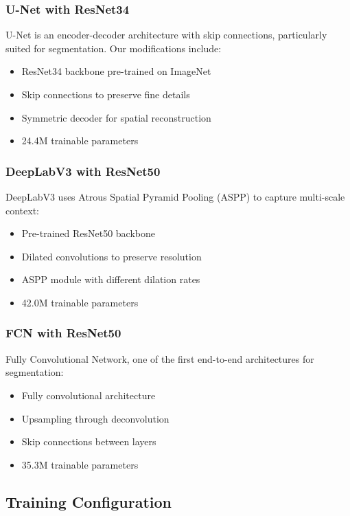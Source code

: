 \documentclass[12pt,a4paper]{article}
\begin{document}
\subsubsection{U-Net with ResNet34}

U-Net is an encoder-decoder architecture with skip connections, particularly suited for segmentation. Our modifications include:
\begin{itemize}
    \item ResNet34 backbone pre-trained on ImageNet
    \item Skip connections to preserve fine details
    \item Symmetric decoder for spatial reconstruction
    \item 24.4M trainable parameters
\end{itemize}

\subsubsection{DeepLabV3 with ResNet50}

DeepLabV3 uses Atrous Spatial Pyramid Pooling (ASPP) to capture multi-scale context:
\begin{itemize}
    \item Pre-trained ResNet50 backbone
    \item Dilated convolutions to preserve resolution
    \item ASPP module with different dilation rates
    \item 42.0M trainable parameters
\end{itemize}

\subsubsection{FCN with ResNet50}

Fully Convolutional Network, one of the first end-to-end architectures for segmentation:
\begin{itemize}
    \item Fully convolutional architecture
    \item Upsampling through deconvolution
    \item Skip connections between layers
    \item 35.3M trainable parameters
\end{itemize}

\subsection{Training Configuration}
\end{document}
